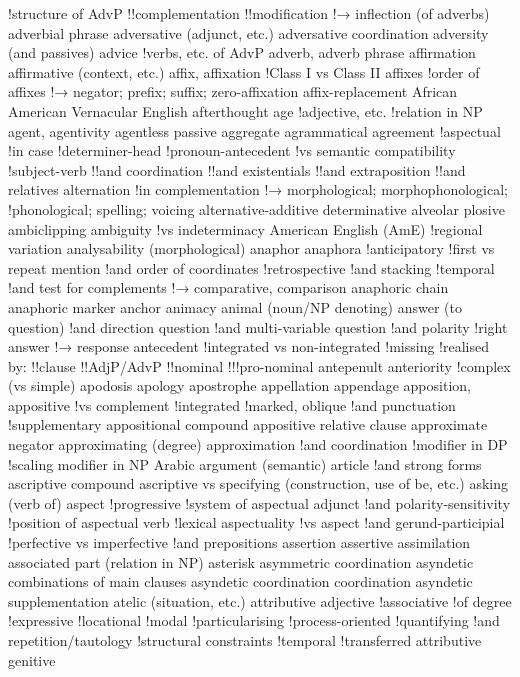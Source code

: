 !structure of AdvP
!!complementation
!!modification
!→ inflection (of adverbs)
adverbial phrase
adversative (adjunct, etc.)
adversative coordination
adversity (and passives)
advice
!verbs, etc. of
AdvP adverb, adverb phrase
affirmation
affirmative (context, etc.)
affix, affixation
!Class I vs Class II affixes
!order of affixes
!→ negator; prefix; suffix; zero-affixation
affix-replacement
African American Vernacular English
afterthought
age
!adjective, etc.
!relation in NP
agent, agentivity
agentless passive
aggregate
agrammatical
agreement
!aspectual
!in case
!determiner-head
!pronoun-antecedent
!vs semantic compatibility
!subject-verb
!!and coordination
!!and existentials
!!and extraposition
!!and relatives
alternation
!in complementation
!→ morphological; morphophonological;
!phonological; spelling; voicing
alternative-additive determinative
alveolar plosive
ambiclipping
ambiguity
!vs indeterminacy
American English (AmE)
!regional variation
analysability (morphological)
anaphor
anaphora
!anticipatory
!first vs repeat mention
!and order of coordinates
!retrospective
!and stacking
!temporal
!and test for complements
!→ comparative, comparison
anaphoric chain
anaphoric marker
anchor
animacy
animal (noun/NP denoting)
answer (to question)
!and direction question
!and multi-variable question
!and polarity
!right answer
!→ response
antecedent
!integrated vs non-integrated
!missing
!realised by:
!!clause
!!AdjP/AdvP
!!nominal
!!!pro-nominal
antepenult
anteriority
!complex (vs simple)
apodosis
apology
apostrophe
appellation
appendage
apposition, appositive
!vs complement
!integrated
!marked, oblique
!and punctuation
!supplementary
appositional compound
appositive relative clause
approximate negator
approximating (degree)
approximation
!and coordination
!modifier in DP
!scaling modifier in NP
Arabic
argument (semantic)
article
!and strong forms
ascriptive compound
ascriptive vs specifying (construction, use of be, etc.)
asking (verb of)
aspect
!progressive
!system of
aspectual adjunct
!and polarity-sensitivity
!position of
aspectual verb
!lexical
aspectuality
!vs aspect
!and gerund-participial
!perfective vs imperfective
!and prepositions
assertion
assertive
assimilation
associated part (relation in NP)
asterisk
asymmetric coordination
asyndetic combinations of main clauses
asyndetic coordination coordination
asyndetic supplementation
atelic (situation, etc.)
attributive adjective
!associative
!of degree
!expressive
!locational
!modal
!particularising
!process-oriented
!quantifying
!and repetition/tautology
!structural constraints
!temporal
!transferred
attributive genitive
